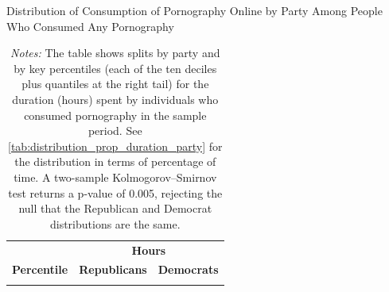 \documentclass[12pt,twoside]{article}
\begin{document}
\begin{table}[ht] \centering \small \setlength\tabcolsep{10 pt}
	\caption{Distribution of Consumption of Pornography Online by Party Among People Who Consumed Any Pornography}
	\label{tab:distribution_duration_party}
	\begin{adjustbox}{max width=\textwidth}
		\begin{tabular}{crr}
			\toprule
			\multicolumn{1}{l}{\textbf{}}&\multicolumn{2}{c}{\textbf{Hours}}\\
			\cmidrule(l){2-3}
			\multicolumn{1}{l}{\textbf{Percentile}}&\multicolumn{1}{c}{\textbf{Republicans}}&\multicolumn{1}{c}{\textbf{Democrats}}\\
			\midrule
			\\
			\bottomrule
		\end{tabular}
	\end{adjustbox}
	\caption*{\footnotesize \emph{Notes:} 
		The table shows splits by party and by key percentiles (each of the ten deciles plus quantiles at the right tail) for the duration (hours) spent by individuals who consumed pornography in the sample period. 
		See \cref{tab:distribution_prop_duration_party} for the distribution in terms of percentage of time. 
		A two-sample Kolmogorov–Smirnov test returns a p-value of 0.005, rejecting the null that the Republican and Democrat distributions are the same.
	}
\end{table}
\end{document}
